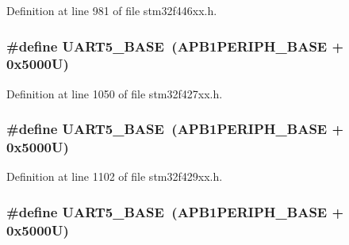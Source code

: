 Definition at line 981 of file stm32f446xx.\+h.

\subsubsection[{\texorpdfstring{U\+A\+R\+T5\+\_\+\+B\+A\+SE}{UART5_BASE}}]{\setlength{\rightskip}{0pt plus 5cm}\#define U\+A\+R\+T5\+\_\+\+B\+A\+SE~({\bf A\+P\+B1\+P\+E\+R\+I\+P\+H\+\_\+\+B\+A\+SE} + 0x5000\+U)}\hypertarget{group___peripheral__memory__map_gaa155689c0e206e6994951dc3cf31052a}{}\label{group___peripheral__memory__map_gaa155689c0e206e6994951dc3cf31052a}


Definition at line 1050 of file stm32f427xx.\+h.

\subsubsection[{\texorpdfstring{U\+A\+R\+T5\+\_\+\+B\+A\+SE}{UART5_BASE}}]{\setlength{\rightskip}{0pt plus 5cm}\#define U\+A\+R\+T5\+\_\+\+B\+A\+SE~({\bf A\+P\+B1\+P\+E\+R\+I\+P\+H\+\_\+\+B\+A\+SE} + 0x5000\+U)}\hypertarget{group___peripheral__memory__map_gaa155689c0e206e6994951dc3cf31052a}{}\label{group___peripheral__memory__map_gaa155689c0e206e6994951dc3cf31052a}


Definition at line 1102 of file stm32f429xx.\+h.

\subsubsection[{\texorpdfstring{U\+A\+R\+T5\+\_\+\+B\+A\+SE}{UART5_BASE}}]{\setlength{\rightskip}{0pt plus 5cm}\#define U\+A\+R\+T5\+\_\+\+B\+A\+SE~({\bf A\+P\+B1\+P\+E\+R\+I\+P\+H\+\_\+\+B\+A\+SE} + 0x5000\+U)}\hypertarget{group___peripheral__memory__map_gaa155689c0e206e6994951dc3cf31052a}{}\label{group___peripheral__memory__map_gaa155689c0e206e6994951dc3cf31052a}


